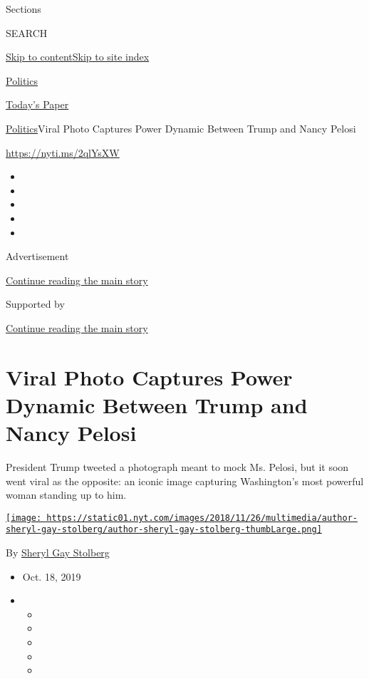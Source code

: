 Sections

SEARCH

\protect\hyperlink{site-content}{Skip to
content}\protect\hyperlink{site-index}{Skip to site index}

\href{https://www.nytimes.com/section/politics}{Politics}

\href{https://myaccount.nytimes.com/auth/login?response_type=cookie\&client_id=vi}{}

\href{https://www.nytimes.com/section/todayspaper}{Today's Paper}

\href{/section/politics}{Politics}\textbar{}Viral Photo Captures Power
Dynamic Between Trump and Nancy Pelosi

\href{https://nyti.ms/2qlYsXW}{https://nyti.ms/2qlYsXW}

\begin{itemize}
\item
\item
\item
\item
\item
\end{itemize}

Advertisement

\protect\hyperlink{after-top}{Continue reading the main story}

Supported by

\protect\hyperlink{after-sponsor}{Continue reading the main story}

\hypertarget{viral-photo-captures-power-dynamic-between-trump-and-nancy-pelosi}{%
\section{Viral Photo Captures Power Dynamic Between Trump and Nancy
Pelosi}\label{viral-photo-captures-power-dynamic-between-trump-and-nancy-pelosi}}

President Trump tweeted a photograph meant to mock Ms. Pelosi, but it
soon went viral as the opposite: an iconic image capturing Washington's
most powerful woman standing up to him.

\href{https://www.nytimes.com/by/sheryl-gay-stolberg}{\texttt{[image: https://static01.nyt.com/images/2018/11/26/multimedia/author-sheryl-gay-stolberg/author-sheryl-gay-stolberg-thumbLarge.png]}}

By \href{https://www.nytimes.com/by/sheryl-gay-stolberg}{Sheryl Gay
Stolberg}

\begin{itemize}
\item
  Oct. 18, 2019
\item
  \begin{itemize}
  \item
  \item
  \item
  \item
  \item
  \end{itemize}
\end{itemize}

